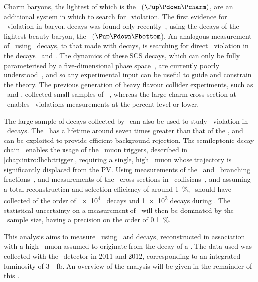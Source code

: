 
Charm baryons, the lightest of which is the \PLambdac~($\Pup\Pdown\Pcharm)$, 
are an additional system in which to search for \CP\ violation.
The first evidence for \CP\ violation in baryon decays was found only 
recently~\cite{Aaij:2016cla}, using the decays of the lightest beauty baryon, 
the \PLambdab~($\Pup\Pdown\Pbottom$).
An analogous measurement of \dACP\ using \PLambdac\ decays, to that made with 
\PDzero decays, is searching for direct \CP\ violation in the decays \LcTopKK\ 
and \LcToppipi.
The dynamics of these \ac{SCS} decays, which can only be fully parameterised by 
a five-dimensional phase space~\cite{Aitala:1999uq}, are currently poorly 
understood~\cite{Bigi:2012ev,PDG2014}, and so any experimental input can be 
useful to guide and constrain the theory.
The previous generation of heavy flavour collider experiments, such as \belle\ 
and \babar, collected small samples of \PLambdac~\cite{Seuster:2005tr}, whereas 
the large charm cross-section at \lhcb\ enables \CP\ violations measurements at 
the percent level or lower.

The large sample of \PB decays collected by \lhcb\ can also be used to study 
\CP\ violation in \PLambdac\ decays.
The \PLambdab\ has a lifetime around seven times greater than that of the 
\PLambdac, and can be exploited to provide efficient background rejection.
The semileptonic decay chain \LbToLcmuX\ enables the usage of the \lhcb\ muon 
triggers, described in \cref{chap:intro:lhcb:trigger}, requiring a single, high 
\pT\ muon whose trajectory is significantly displaced from the \ac{PV}.
Using measurements of the \LbToLcmuX\ and \LcTophh\ branching 
fractions~\cite{PDG2014,Ablikim:2016tze}, and measurements of the \PLambdab\ 
cross-sections in \pp\ collisions~\cite{Aaij:2015fea}, and assuming a total 
reconstruction and selection efficiency of around \SI{1}{\percent}, \lhcb\ 
should have collected of the order of \num{e4} \ppipi\ decays and \num{1e3} 
\pKK decays during \runone.
The statistical uncertainty on a measurement of \dACP\ will then be dominated 
by the \pKK\ sample size, having a precision on the order of 
\SI{0.1}{\percent}.

This analysis aims to measure \dACP\ using \LcTopKK\ and \LcToppipi decays, 
reconstructed in association with a high \pT\ muon assumed to originate from 
the decay of a \PLambdab.
The data used was collected with the \lhcb\ detector in 2011 and 2012, 
corresponding to an integrated luminosity of \SI{3}{\per\femto\barn}.
An overview of the analysis will be given in the remainder of this 
.

